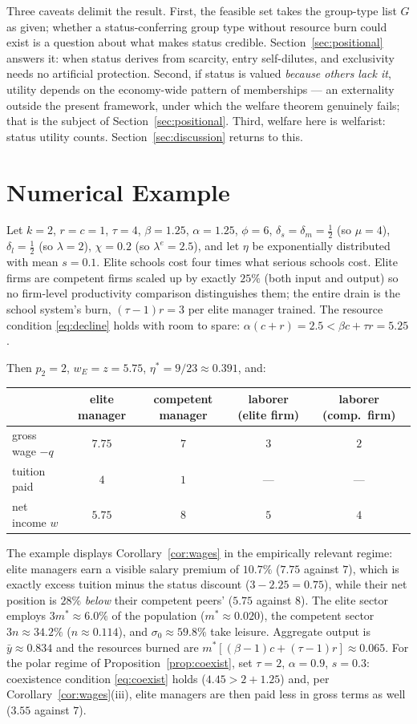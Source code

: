 \documentclass[12pt,letterpaper]{article}
\theoremstyle{definition}
\begin{document}
Three caveats delimit the result.
First, the feasible set takes the group-type list $G$ as given; whether a status-conferring group type without resource burn could exist is a question about what makes status credible.
Section~\ref{sec:positional} answers it: when status derives from scarcity, entry self-dilutes, and exclusivity needs no artificial protection.
Second, if status is valued \emph{because others lack it}, utility depends on the economy-wide pattern of memberships --- an externality outside the present framework, under which the welfare theorem genuinely fails; that is the subject of Section~\ref{sec:positional}.
Third, welfare here is welfarist: status utility counts.
Section~\ref{sec:discussion} returns to this.

\section{Numerical Example}\label{sec:example}

Let $k=2$, $r=c=1$, $\tau=4$, $\beta=1.25$, $\alpha=1.25$, $\phi=6$, $\delta_s=\delta_m=\tfrac12$ (so $\mu=4$), $\delta_l=\tfrac12$ (so $\lambda=2$), $\chi=0.2$ (so $\lambda^{e}=2.5$), and let $\eta$ be exponentially distributed with mean $s=0.1$.
Elite schools cost four times what serious schools cost.
Elite firms are competent firms scaled up by exactly $25\%$ (both input and output) so no firm-level productivity comparison distinguishes them; the entire drain is the school system's burn, $(\tau-1)r=3$ per elite manager trained.
The resource condition \eqref{eq:decline} holds with room to spare: $\alpha(c+r)=2.5 < \beta c+\tau r = 5.25$.

Then $p_2=2$, $w_E=z=5.75$, $\eta^\ast=9/23\approx 0.391$, and:
\begin{center}
\begin{tabular}{lcccc}
\toprule
 & elite manager & competent manager & laborer (elite firm) & laborer (comp.\ firm)\\
\midrule
gross wage $-q$ & $7.75$ & $7$ & $3$ & $2$\\
tuition paid & $4$ & $1$ & --- & ---\\
net income $w$ & $5.75$ & $8$ & $5$ & $4$\\
\bottomrule
\end{tabular}
\end{center}
The example displays Corollary~\ref{cor:wages} in the empirically relevant regime: elite managers earn a visible salary premium of $10.7\%$ ($7.75$ against $7$), which is exactly excess tuition minus the status discount ($3 - 2.25 = 0.75$), while their net position is $28\%$ \emph{below} their competent peers' ($5.75$ against $8$).
The elite sector employs $3m^\ast\approx 6.0\%$ of the population ($m^\ast\approx 0.020$), the competent sector $3n\approx 34.2\%$ ($n\approx 0.114$), and $\sigma_0\approx 59.8\%$ take leisure.
Aggregate output is $\bar{y}\approx 0.834$ and the resources burned are $m^\ast[(\beta-1)c+(\tau-1)r]\approx 0.065$.
For the polar regime of Proposition~\ref{prop:coexist}, set $\tau=2$, $\alpha=0.9$, $s=0.3$: coexistence condition \eqref{eq:coexist} holds ($4.45 > 2 + 1.25$) and, per Corollary~\ref{cor:wages}(iii), elite managers are then paid less in gross terms as well ($3.55$ against $7$).
\end{document}
